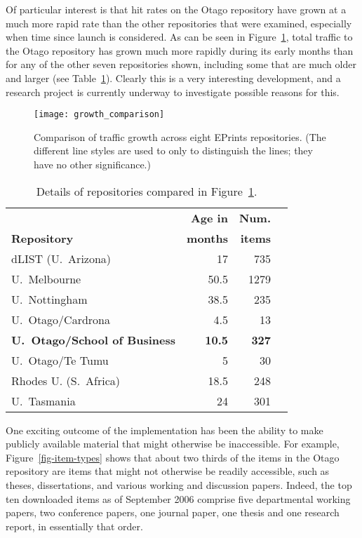 \documentclass[12pt,pdftex,a4paper,titlepage]{article}
\begin{document}
Of particular interest is that hit rates on the Otago repository have grown at a much more rapid rate than the other repositories that were examined, especially when time since launch is considered. As can be seen in Figure~\ref{fig-growth-comparison}, total traffic to the Otago repository has grown much more rapidly during its early months than for any of the other seven repositories shown, including some that are much older and larger (see Table~\ref{tab-reopsitories}). Clearly this is a very interesting development, and a research project is currently underway to investigate possible reasons for this.


\begin{figure}
	\centering
	\texttt{[image: growth\_comparison]}
	\caption{Comparison of traffic growth across eight EPrints repositories. (The different line styles are used to only to distinguish the lines; they have no other significance.)}
	\label{fig-growth-comparison}
\end{figure}


\begin{table}
	\caption{Details of repositories compared in Figure~\ref{fig-growth-comparison}.}
	\label{tab-reopsitories}
	\begin{center}
		\begin{tabular}{lrrl}
													&	\textbf{Age in}	&	\textbf{Num.}	\\
			\textbf{Repository}						&	\textbf{months}	&	\textbf{items}	\\
			\hline
			dLIST (U.\ Arizona)						&	17				&	735	\\
			U.\ Melbourne							&	50.5			&	1279	\\
			U.\ Nottingham							&	38.5			&	235	\\
			U.\ Otago/Cardrona						&	4.5				&	13	\\
			\textbf{U.\ Otago/School of Business}	&	\textbf{10.5}	&	\textbf{327}	\\
			U.\ Otago/Te Tumu						&	5				&	30	\\
			Rhodes U. (S.\ Africa)					&	18.5			&	248	\\
			U.\ Tasmania							&	24				&	301	\\
		\end{tabular}
	\end{center}
\end{table}


One exciting outcome of the implementation has been the ability to make publicly available material that might otherwise be inaccessible. For example, Figure~\ref{fig-item-types} shows that about two thirds of the items in the Otago repository are items that might not otherwise be readily accessible, such as theses, dissertations, and various working and discussion papers. Indeed, the top ten downloaded items as of September 2006 comprise five departmental working papers, two conference papers, one journal paper, one thesis and one research report, in essentially that order.
\end{document}
